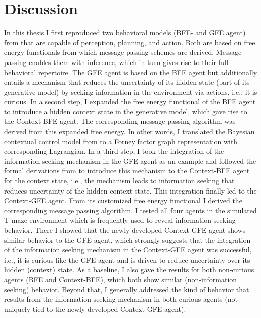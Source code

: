 \chapter{Discussion}
\label{discussion}

In this thesis I first reproduced two behavioral models (BFE- and GFE agent) from \textcite{schwoebel2018,delaar2023} that are capable of perception, planning, and action. Both are based on free energy functionals from which message passing schemes are derived. Message passing enables them with inference, which in turn gives rise to their full behavioral repertoire. The GFE agent is based on the BFE agent but additionally entails a mechanism that reduces the uncertainty of its hidden state (part of its generative model) by seeking information in the environment via actions, i.e., it is curious.
In a second step, I expanded the free energy functional of the BFE agent to introduce a hidden context state in the generative model, which gave rise to the Context-BFE agent. The corresponding message passing algorithm was derived from this expanded free energy. In other words, I translated the Bayesian contextual control model from \textcite{schwoebel2021} to a Forney factor graph representation with corresponding Lagrangian.
In a third step, I took the integration of the information seeking mechanism in the GFE agent as an example and followed the formal derivations from \textcite{delaar2025} to introduce this mechanism to the Context-BFE agent for the context state, i.e., the mechanism leads to information seeking that reduces uncertainty of the hidden context state. This integration finally led to the Context-GFE agent. From its customized free energy functional I derived the corresponding message passing algorithm.
I tested all four agents in the simulated T-maze environment which is frequently used to reveal information seeking behavior. There I showed that the newly developed Context-GFE agent shows similar behavior to the GFE agent, which strongly suggests that the integration of the information seeking mechanism in the Context-GFE agent was successful, i.e., it is curious like the GFE agent and is driven to reduce uncertainty over its hidden (context) state. As a baseline, I also gave the results for both non-curious agents (BFE and Context-BFE), which both show similar (non-information seeking) behavior.
Beyond that, I generally addressed the kind of behavior that results from the information seeking mechanism in both curious agents (not uniquely tied to the newly developed Context-GFE agent).

